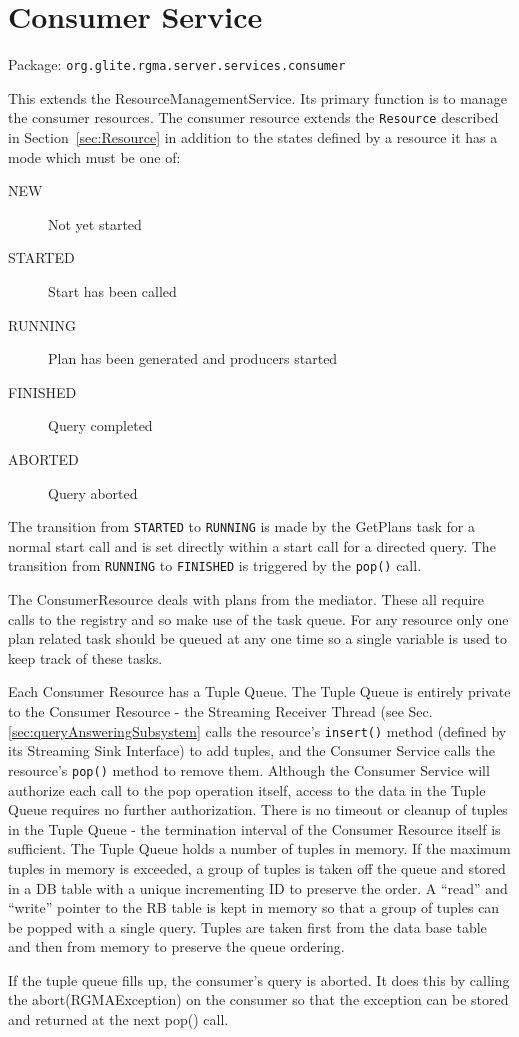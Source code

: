 \section{Consumer Service}
\label{sec:consumerService}

Package: \texttt{org.glite.rgma.server.services.consumer}


This extends the ResourceManagementService. Its primary function is to manage
the consumer resources. The consumer resource 
extends the \texttt{Resource} described in
Section~\ref{sec:Resource} in addition to the states defined by a
resource it has a mode which must be one of:

\begin{description}

\item[NEW] Not yet started

\item[STARTED] Start has been called

\item[RUNNING] Plan has been generated and producers started

\item[FINISHED] Query completed

\item[ABORTED] Query aborted

\end{description}

The transition from \texttt{STARTED} to \texttt{RUNNING} is made by the 
GetPlans task for a normal start call and is set directly within a start call 
for a directed query. The transition from \texttt{RUNNING} to \texttt{FINISHED} 
is triggered by the \texttt{pop()} call.

The ConsumerResource deals with plans from the mediator. These all require calls
to the registry and so make use of the task queue. For any resource only one plan
related task should be queued at any one time so a single variable is used to
keep track of these tasks.

Each Consumer Resource has a Tuple Queue.  The Tuple Queue is entirely private 
to the Consumer Resource - the Streaming Receiver Thread (see
Sec.\ref{sec:queryAnsweringSubsystem} calls the resource's 
\texttt{insert()} method (defined by its Streaming Sink Interface) to add 
tuples, and the Consumer Service calls the resource's \texttt{pop()} method to 
remove them. Although the Consumer Service will authorize each call to the pop 
operation itself, access to the data in the Tuple Queue requires no further 
authorization. There is no timeout or cleanup of tuples in the Tuple Queue - 
the termination interval of the Consumer Resource itself is sufficient. The 
Tuple Queue holds a number of tuples in memory. If the maximum tuples in memory 
is exceeded, a group of tuples is taken off the queue and stored in a DB table 
with a unique incrementing ID to preserve the order. A ``read'' and ``write'' 
pointer to the RB table is kept in memory so that a group of tuples can be 
popped with a single query. Tuples are taken first from the data base table and 
then from memory to preserve the queue ordering.

If the tuple queue fills up, the consumer's query is aborted. It does this by
calling the abort(RGMAException) on the consumer so that the exception can
be stored and returned at the next pop() call.
